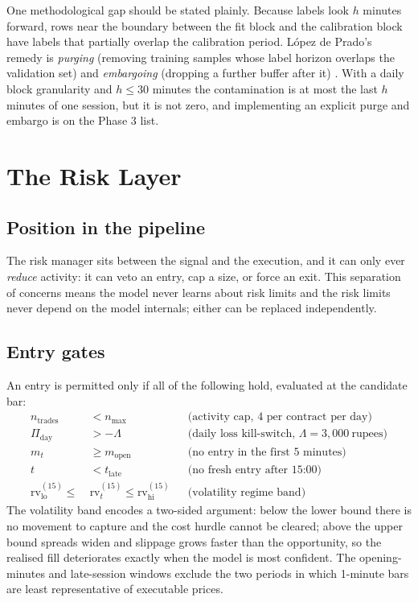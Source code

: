 \documentclass[11pt,a4paper]{article}
\begin{document}
One methodological gap should be stated plainly. Because labels look $h$ minutes forward,
rows near the boundary between the fit block and the calibration block have labels that
partially overlap the calibration period. López de Prado's remedy is \emph{purging}
(removing training samples whose label horizon overlaps the validation set) and
\emph{embargoing} (dropping a further buffer after it) \cite{lopezdeprado,purgedcv}. With
a daily block granularity and $h \le 30$ minutes the contamination is at most the last
$h$ minutes of one session, but it is not zero, and implementing an explicit purge and
embargo is on the Phase 3 list.

\section{The Risk Layer}\label{sec:risk}

\subsection{Position in the pipeline}

The risk manager sits between the signal and the execution, and it can only ever
\emph{reduce} activity: it can veto an entry, cap a size, or force an exit. This
separation of concerns means the model never learns about risk limits and the risk limits
never depend on the model internals; either can be replaced independently.

\subsection{Entry gates}

An entry is permitted only if all of the following hold, evaluated at the candidate bar:
\begin{align}
n_{\text{trades}} &< n_{\max} &&\text{(activity cap, 4 per contract per day)}\\
\Pi_{\text{day}} &> -\Lambda &&\text{(daily loss kill-switch, }\Lambda = 3{,}000\ \text{rupees})\\
m_t &\ge m_{\text{open}} &&\text{(no entry in the first 5 minutes)}\\
t &< t_{\text{late}} &&\text{(no fresh entry after 15:00)}\\
\text{rv}^{(15)}_{\text{lo}} \le\ &\text{rv}^{(15)}_t \le \text{rv}^{(15)}_{\text{hi}}
&&\text{(volatility regime band)}
\end{align}
The volatility band encodes a two-sided argument: below the lower bound there is no
movement to capture and the cost hurdle cannot be cleared; above the upper bound spreads
widen and slippage grows faster than the opportunity, so the realised fill deteriorates
exactly when the model is most confident. The opening-minutes and late-session windows
exclude the two periods in which 1-minute bars are least representative of executable
prices.
\end{document}
